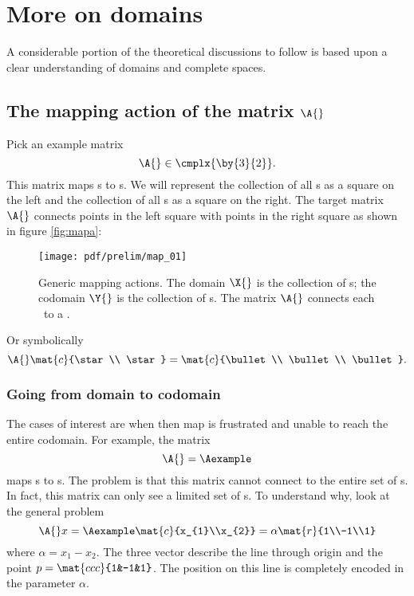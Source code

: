 \section{More on domains}
A considerable portion of the theoretical discussions to follow is based upon a clear understanding of domains and complete spaces. 

\subsection{The mapping action of the matrix $\A{}$}
Pick an example matrix 
\begin{equation}
  \A{}\in\cmplx{\by{3}{2}}.
\end{equation}
This matrix maps \vv s to \vvv s. We will represent the collection of all \vv s as a square on the left and the collection of all \vvv s as a square on the right. The target matrix $\A{}$ connects points in the left square with points in the right square as shown in figure \eqref{fig:mapa}:
\begin{figure}[htbp] %
   \centering
   \texttt{[image: pdf/prelim/map\_01]} 
   \caption[Generic mapping actions]{Generic mapping actions. The domain $\X{}$ is the collection of \vv s; the codomain $\Y{}$ is the collection of \vvv s. The matrix $\A{}$ connects each \vv \ to a \vvv.}
   \label{fig:mapa}
\end{figure}

Or symbolically
\begin{equation}
  \A{} \mat{c}{\star \\ \star} = \mat{c}{\bullet \\ \bullet \\ \bullet }.
\end{equation}

\subsubsection{Going from domain to codomain}
The cases of interest are when then map is frustrated and unable to reach the entire codomain. For example, the matrix 
\begin{equation}
  \A{}= \Aexample
  \label{eq:A}
\end{equation}
maps \vv s to \vvv s. The problem is that this matrix cannot connect to the entire set of \vvv s. In fact, this matrix can only see a limited set of \vvv s. To understand why, look at the general problem
\begin{equation}
  \A{} x = \Aexample \mat{c}{x_{1}\\x_{2}} = \alpha\mat{r}{1\\-1\\1}
\end{equation}
where $\alpha = x_{1}-x_{2}$. The three vector describe the line through origin and the point $p=\mat{ccc}{1&-1&1}$. The position on this line is completely encoded in the parameter $\alpha$.

